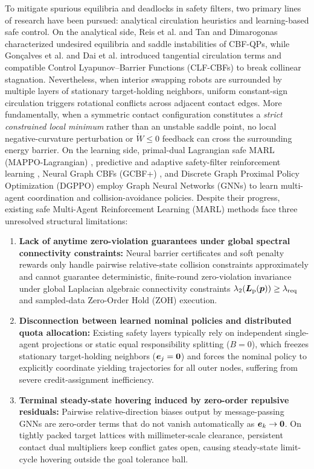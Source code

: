 To mitigate spurious equilibria and deadlocks in safety filters, two primary lines of research have been pursued: analytical circulation heuristics and learning-based safe control. On the analytical side, Reis et al. \cite{reis2021} and Tan and Dimarogonas \cite{tan2024equilibria} characterized undesired equilibria and saddle instabilities of CBF-QPs, while Gon\c{c}alves et al. \cite{goncalves2023circulation} and Dai et al. \cite{dai2024compatible} introduced tangential circulation terms and compatible Control Lyapunov--Barrier Functions (CLF-CBFs) to break collinear stagnation. Nevertheless, when interior swapping robots are surrounded by multiple layers of stationary target-holding neighbors, uniform constant-sign circulation triggers rotational conflicts across adjacent contact edges. More fundamentally, when a symmetric contact configuration constitutes a \emph{strict constrained local minimum} rather than an unstable saddle point, no local negative-curvature perturbation or $\dot W\le 0$ feedback can cross the surrounding energy barrier. On the learning side, primal-dual Lagrangian safe MARL (MAPPO-Lagrangian) \cite{gu2023safe}, predictive and adaptive safety-filter reinforcement learning \cite{wabersich2021,liu2026saferl}, Neural Graph CBFs (GCBF+) \cite{zhang2025gcbf}, and Discrete Graph Proximal Policy Optimization (DGPPO) \cite{zhang2025dgppo} employ Graph Neural Networks (GNNs) to learn multi-agent coordination and collision-avoidance policies. Despite their progress, existing safe Multi-Agent Reinforcement Learning (MARL) methods face three unresolved structural limitations:
\begin{enumerate}
 \item \textbf{Lack of anytime zero-violation guarantees under global spectral connectivity constraints:} Neural barrier certificates and soft penalty rewards only handle pairwise relative-state collision constraints approximately and cannot guarantee deterministic, finite-round zero-violation invariance under global Laplacian algebraic connectivity constraints $\lambda_2(\boldsymbol{L}_{\mathrm{p}}(\boldsymbol{p}))\ge\lambda_{\mathrm{req}}$ and sampled-data Zero-Order Hold (ZOH) execution.
 \item \textbf{Disconnection between learned nominal policies and distributed quota allocation:} Existing safety layers typically rely on independent single-agent projections or static equal responsibility splitting ($B=0$), which freezes stationary target-holding neighbors ($\boldsymbol{e}_j=\boldsymbol 0$) and forces the nominal policy to explicitly coordinate yielding trajectories for all outer nodes, suffering from severe credit-assignment inefficiency.
 \item \textbf{Terminal steady-state hovering induced by zero-order repulsive residuals:} Pairwise relative-direction biases output by message-passing GNNs are zero-order terms that do not vanish automatically as $\boldsymbol{e}_k\to\boldsymbol 0$. On tightly packed target lattices with millimeter-scale clearance, persistent contact dual multipliers keep conflict gates open, causing steady-state limit-cycle hovering outside the goal tolerance ball.
\end{enumerate}

